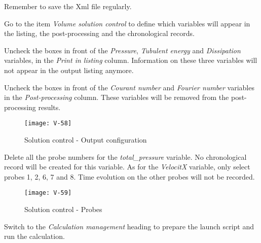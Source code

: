 Remember to save the Xml file regularly.


\newpage
Go to the item {\itshape Volume solution control} to define which variables will
appear in the listing, the post-processing and the chronological records.

Uncheck the boxes in front of the {\itshape Pressure}, {\itshape Tubulent energy}
and {\itshape Dissipation} variables, in the {\itshape  Print in listing}
column. Information on these three variables will not appear in the output
listing anymore.

Uncheck the boxes in front of the {\itshape Courant number} and {\itshape
Fourier number} variables in the {\itshape Post-processing} column. These
variables will be removed from the post-processing results.

\begin{figure}[h!]
\begin{center}
\texttt{[image: V-58]}
\caption{Solution control - Output configuration}
\label{fig29_e2}
\end{center}
\end{figure}


\newpage
Delete all the probe numbers for the {\itshape total\_pressure} variable. No
chronological record will be created for this variable. As for the
{\itshape VelocitX} variable, only select probes  1, 2, 6, 7 and 8. Time
evolution on the other probes will not be recorded.

\begin{figure}[h!]
\begin{center}
\texttt{[image: V-59]}
\caption{Solution control - Probes}
\label{fig30_e2}
\end{center}
\end{figure}


Switch to the {\itshape Calculation management} heading to prepare the launch
script and run the calculation.

